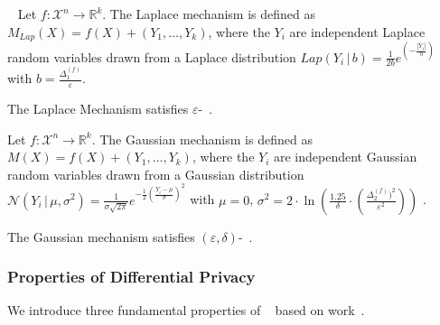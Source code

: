 \begin{definition}\
    \label{def:laplaceMechanism}
    Let $f : \mathcal{X}^{n} \rightarrow \mathbb{R}^{k}$. The Laplace mechanism is defined as $M_{Lap}\left( X\right) =f\left( X\right) +\left( Y_{1},\ldots ,Y_{k}\right) $, where the $Y_{i}$ are independent Laplace random variables drawn from a Laplace distribution $Lap \left(  Y_{i}\,|\, b\right) =\frac{1}{2b}e^{\left( -\frac{\left  | Y_{i}\right|}{b}\right)} $ with $b=\frac{\Delta _{1}^{\left(f\right)}}{\varepsilon }$.
\end{definition}

\begin{theorem}
    The Laplace Mechanism satisfies $\varepsilon$-\differentialprivacy~\cite{dwork2014algorithmic}.
\end{theorem}

\begin{definition}
    Let $f : \mathcal{X}^{n} \rightarrow \mathbb{R}^{k}$. The Gaussian mechanism is defined as $M\left( X\right) =f\left( X\right) +\left( Y_{1},\ldots ,Y_{k}\right) $, where the $Y_{i}$ are independent Gaussian random variables drawn from a Gaussian distribution $\mathcal{N}  \left(  Y_{i}\,|\, \mu ,\sigma ^{2}\right) =\frac{1}{\sigma \sqrt{2\pi }}e^{-\frac{1}{2}\left( \frac{Y_{i}-\mu}{\sigma }\right) ^{2}}$ with  $\mu=0$, $\sigma ^{2}=2\cdot \ln \left( \frac{1.25}{\delta }\cdot \left( \frac{ \Delta _{2}^{\left(f\right)}) ^{2}}{\varepsilon ^{2}}\right) \right)$ .
    \label{def:gaussianMechanism}
\end{definition}

\begin{theorem}
    The Gaussian mechanism satisfies $\left(\varepsilon,\delta\right)$-\differentialprivacy~\cite{dwork2014algorithmic}.
\end{theorem}

\subsubsection{Properties of Differential Privacy}
We introduce three fundamental properties of \differentialprivacy~\cite{dwork2006differential, dwork2006calibrating} based on work~\cite{dwork2014algorithmic}.

